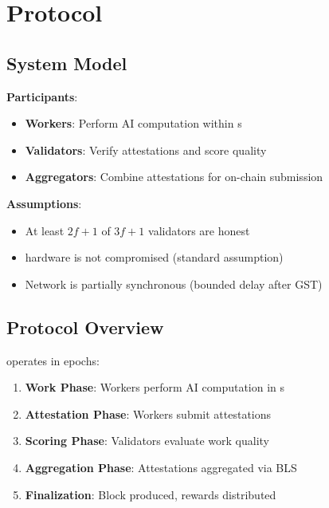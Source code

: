 \section{\PoAI{}
 Protocol}
\label{sec:protocol}

\subsection{System Model}

\textbf{Participants}:
\begin{itemize}
    \item \textbf{Workers}: Perform AI computation within \TEE{}s
    \item \textbf{Validators}: Verify attestations and score quality
    \item \textbf{Aggregators}: Combine attestations for on-chain submission
\end{itemize}

\textbf{Assumptions}:
\begin{itemize}
    \item At least $2f+1$ of $3f+1$ validators are honest
    \item \TEE{} hardware is not compromised (standard \TEE{} assumption)
    \item Network is partially synchronous (bounded delay after GST)
\end{itemize}

\subsection{Protocol Overview}

\PoAI{} operates in epochs:

\begin{enumerate}
    \item \textbf{Work Phase}: Workers perform AI computation in \TEE{}s
    \item \textbf{Attestation Phase}: Workers submit \TEE{} attestations
    \item \textbf{Scoring Phase}: Validators evaluate work quality
    \item \textbf{Aggregation Phase}: Attestations aggregated via BLS
    \item \textbf{Finalization}: Block produced, rewards distributed
\end{enumerate}

